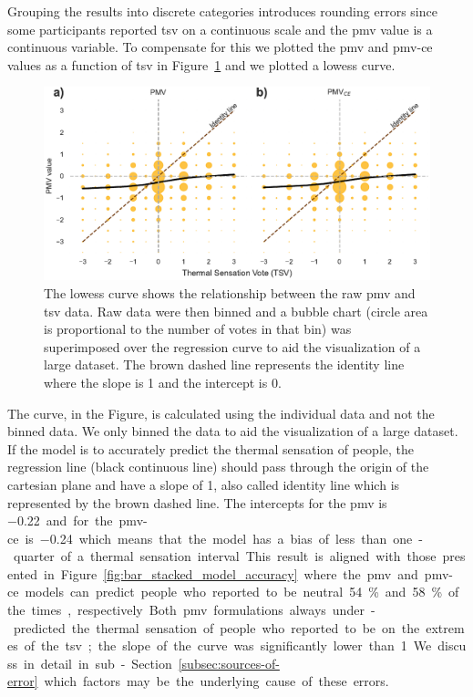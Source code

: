 Grouping the results into discrete categories introduces rounding errors since some participants reported \ac{tsv} on a continuous scale and the \ac{pmv} value is a continuous variable.
To compensate for this we plotted the \ac{pmv} and \ac{pmv-ce} values as a function of \ac{tsv} in Figure~\ref{fig:bubble_models_vs_tsv} and we plotted a \ac{lowess} curve.
\begin{figure}[htb!]
    \centering
    \includegraphics[width=\textwidth]{figures/bubble_models_vs_tsv}
    \caption{The \ac{lowess} curve shows the relationship between the raw \ac{pmv} and \ac{tsv} data.
    Raw data were then binned and a bubble chart (circle area is proportional to the number of votes in that bin) was superimposed over the regression curve to aid the visualization of a large dataset.
    The brown dashed line represents the identity line where the slope is 1 and the intercept is 0.}
    \label{fig:bubble_models_vs_tsv}
\end{figure}
The curve, in the Figure, is calculated using the individual data and not the binned data.
We only binned the data to aid the visualization of a large dataset.
If the model is to accurately predict the thermal sensation of people, the regression line (black continuous line) should pass through the origin of the cartesian plane and have a slope of 1, also called identity line which is represented by the brown dashed line.
The intercepts for the \ac{pmv} is \qty{-0.22} and for the \ac{pmv-ce} is \qty{-0.24} which means that the model has a bias of less than one-quarter of a thermal sensation interval.
This result is aligned with those presented in Figure~\ref{fig:bar_stacked_model_accuracy} where the \ac{pmv} and \ac{pmv-ce} models can predict people who reported to be neutral \qty{54}{\percent} and \qty{58}{\percent} of the times, respectively.
Both \ac{pmv} formulations always under-predicted the thermal sensation of people who reported to be on the extremes of the \ac{tsv};
the slope of the curve was significantly lower than 1.
We discuss in detail in sub-Section~\ref{subsec:sources-of-error} which factors may be the underlying cause of these errors.

